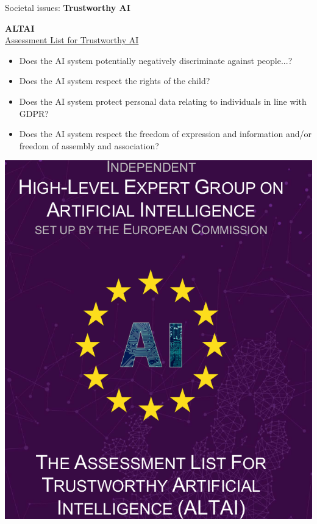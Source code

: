 \documentclass[10pt,serif,mathserif,compress,hyperref={colorlinks}]{beamer}
\begin{document}
\begin{frame}{Societal issues: {\bf Trustworthy AI}}

  \hspace*{-5mm}
  \begin{minipage}{.5\textwidth}
    {\Large\bf ALTAI}\\
    \href{https://digital-strategy.ec.europa.eu/en/library/assessment-list-trustworthy-artificial-intelligence-altai-self-assessment}{
      Assessment List for Trustworthy AI}
  \begin{itemize}
  \item Does the AI system potentially negatively discriminate against people...?
  \item Does the AI system respect the rights of the child?
  \item Does the AI system protect personal data relating to individuals in line with GDPR?
  \item Does the AI system respect the freedom of expression and information and/or freedom of
    assembly and association?
  \end{itemize}
  \end{minipage}\begin{minipage}{1.\textwidth}
   \hspace*{2mm}\vspace*{-2mm}
  \includegraphics[width=.6\textwidth]{images/ALTAI.png}
  \end{minipage}
  
\end{frame}
\end{document}
